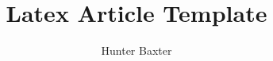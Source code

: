 \documentclass{article}
\title{Latex Article Template}
\author{Hunter Baxter}
\begin{document}
\maketitle

% 
\tableofcontents
\cite{test}
\printbibliography
\end{document}
